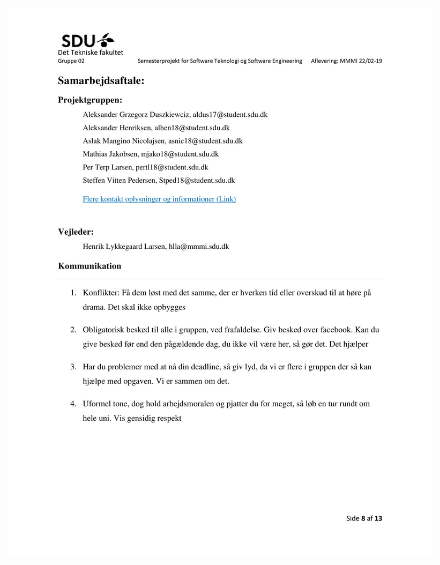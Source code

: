 \begin{figure}[hb]
  \includegraphics[scale = 0.33]{./PNG/Projektforslag/Projektforslag-08.jpg} 
\end{figure}

